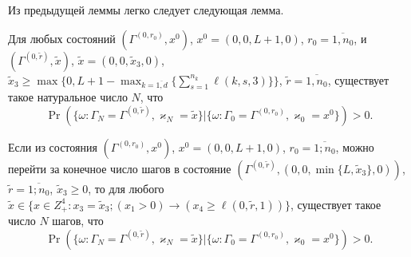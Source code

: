 \documentclass[a4paper,12pt,russian]{extarticle}
\begin{document}
Из предыдущей леммы легко следует следующая лемма.
\begin{lemma}
Для любых состояний $(\Gamma^{(0,r_0)},x^0)$, $x^0=(0,0,L+1,0)$,  $r_0=\overline{1,n_0}$, и
$(\Gamma^{(0,\tilde{r})},\tilde{x})$,
$\tilde{x}=(0,0,\tilde{x}_3,0)$, $\tilde{x}_3\geqslant \max{\{0,L+1-\max_{k=\overline{1,d}}{\{ \sum_{s=1}^{n_k}\ell(k,s,3)\}}\}}$,
$\tilde{r} = \overline{1,n_0}$, существует такое натуральное число $N$, что 
\begin{equation*}
\Pr(\{\omega\colon \Gamma_{N}=\Gamma^{(0,\tilde{r} )}, \varkappa_{N}=\tilde{x}\}|\{\omega\colon 
\Gamma_{0}=\Gamma^{(0,r_0)}, \varkappa_{0}=x^0\})>0.
\end{equation*}
\end{lemma}

\begin{lemma}
Если из состояния $(\Gamma^{(0,r_0)},x^0)$, $x^0=(0,0,L+1,0)$, $r_0=\overline{1;n_0}$, можно перейти за конечное число шагов в состояние $(\Gamma^{(0,\tilde{r})},(0,0,\min\{L,\tilde{x}_3\},0))$, $\tilde{r}=\overline{1;n_0}$, $\tilde{x}_3\geqslant 0$, то для любого $\tilde{x}\in \{x \in Z_+^4\colon x_3=\tilde{x}_3; (x_1 > 0)\rightarrow (x_4\geqslant \ell(0,\tilde{r},1))\}$, существует такое число $N$ шагов, что
\begin{equation*}
\Pr(\{\omega\colon \Gamma_{N}=\Gamma^{(0,\tilde{r} )}, \varkappa_{N}=\tilde{x}\}|\{\omega\colon 
\Gamma_{0}=\Gamma^{(0,r_0)}, \varkappa_{0}=x^0\})>0.
\end{equation*}
\end{lemma}
\end{document}
